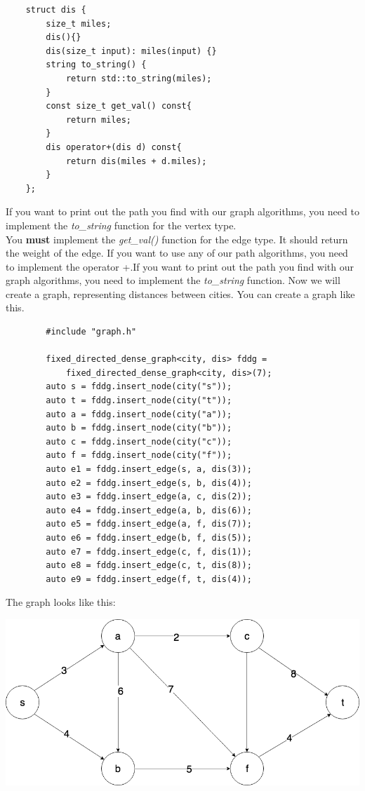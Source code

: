\documentclass{article}
\begin{document}
    \begin{lstlisting}
    struct dis {
	    size_t miles;
	    dis(){}
	    dis(size_t input): miles(input) {}
	    string to_string() {
	    	return std::to_string(miles);
	    }
	    const size_t get_val() const{
	    	return miles;
	    }
	    dis operator+(dis d) const{
	    	return dis(miles + d.miles);
	    }
    };
    \end{lstlisting}
    If you want to print out the path you find with our graph algorithms, you need to implement the \textit{to\_string} function for the vertex type.
    \\
    You \textbf{must} implement the \textit{get\_val()} function for the edge type. It should return the weight of the edge. If you want to use any of our path algorithms, you need to implement the operator +.If you want to print out the path you find with our graph algorithms, you need to implement the \textit{to\_string} function.
    Now we will create a graph, representing distances between cities. You can create a graph like this.
    \begin{lstlisting}
    	#include "graph.h"
    
        fixed_directed_dense_graph<city, dis> fddg =
        	fixed_directed_dense_graph<city, dis>(7);
        auto s = fddg.insert_node(city("s"));
        auto t = fddg.insert_node(city("t"));
        auto a = fddg.insert_node(city("a"));
        auto b = fddg.insert_node(city("b"));
        auto c = fddg.insert_node(city("c"));
        auto f = fddg.insert_node(city("f"));
        auto e1 = fddg.insert_edge(s, a, dis(3));
        auto e2 = fddg.insert_edge(s, b, dis(4));
        auto e3 = fddg.insert_edge(a, c, dis(2));
        auto e4 = fddg.insert_edge(a, b, dis(6));
        auto e5 = fddg.insert_edge(a, f, dis(7));
        auto e6 = fddg.insert_edge(b, f, dis(5));
        auto e7 = fddg.insert_edge(c, f, dis(1));
        auto e8 = fddg.insert_edge(c, t, dis(8));
        auto e9 = fddg.insert_edge(f, t, dis(4));
    \end{lstlisting}
The graph looks like this:
\begin{center}
	\includegraphics[width=\linewidth]  {graph1.png}
\end{center}
\end{document}
